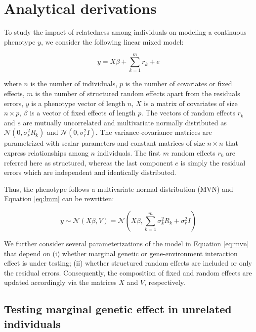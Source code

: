 \documentclass[]{book}
\begin{document}
\section{Analytical derivations}\label{derivations}

To study the impact of relatedness among individuals on modeling a
continuous phenotype \(y\), we consider the following linear mixed
model:

\begin{equation}
  y = X \beta + \sum_{k=1}^{m}{r_k} + e
\label{eq:lmm}
\end{equation}

where \(n\) is the number of individuals, \(p\) is the number of
covariates or fixed effects, \(m\) is the number of structured random
effects apart from the residuals errors, \(y\) is a phenotype vector of
length \(n\), \(X\) is a matrix of covariates of size \(n \times p\),
\(\beta\) is a vector of fixed effects of length \(p\). The vectors of
random effects \(r_k\) and \(e\) are mutually uncorrelated and
multivariate normally distributed as \(\mathcal{N}(0, \sigma^2_k R_k)\)
and \(\mathcal{N}(0, \sigma^2_r I)\). The variance-covariance matrices
are parametrized with scalar parameters and constant matrices of size
\(n \times n\) that express relationships among \(n\) individuals. The
first \(m\) random effects \(r_k\) are referred here as structured,
whereas the last component \(e\) is simply the residual errors which are
independent and identically distributed.

Thus, the phenotype follows a multivariate normal distribution (MVN) and
Equation \eqref{eq:lmm} can be rewritten:

\begin{equation}
  y \sim \mathcal{N} (X \beta, V) = \mathcal{N} (X \beta, \sum_{k=1}^{m}{\sigma_k^2 R_k} + \sigma_r^2 I) 
\label{eq:mvn}
\end{equation}

We further consider several parameterizations of the model in Equation
\eqref{eq:mvn} that depend on (i) whether marginal genetic or
gene-environment interaction effect is under testing; (ii) whether
structured random effects are included or only the residual errors.
Consequently, the composition of fixed and random effects are updated
accordingly via the matrices \(X\) and \(V\), respectively.

\subsection{Testing marginal genetic effect in unrelated
individuals}\label{lmg}
\end{document}
